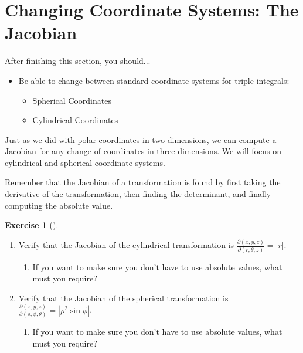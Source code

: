 \documentclass[10pt,]{book}
\theoremstyle{plain}
\theoremstyle{definition}
\theoremstyle{definition}
\theoremstyle{definition}
\theoremstyle{definition}
\newtheorem{exploration}[project]{Exercise}
\theoremstyle{definition}
\numberwithin{equation}{section}
\newcommand{\ds}{\displaystyle}
\begin{document}
\section[{Changing Coordinate Systems: The Jacobian}]{Changing Coordinate Systems: The Jacobian}\label{section-46}
After finishing this section, you should...%
\leavevmode%
\begin{itemize}[label=\textbullet]
\item{}Be able to change between standard coordinate systems for triple integrals:%
%
\begin{itemize}[label=$\circ$]
\item{}Spherical Coordinates%
\item{}Cylindrical Coordinates%
\end{itemize}
\end{itemize}
Just as we did with polar coordinates in two dimensions, we can compute a Jacobian for any change of coordinates in three dimensions. We will focus on cylindrical and spherical coordinate systems.%
\par
Remember that the Jacobian of a transformation is found by first taking the derivative of the transformation, then finding the determinant, and finally computing the absolute value.%
\begin{exploration}[]\label{exploration-302}
\leavevmode%
\begin{enumerate}[font=\bfseries,label=(\alph*),ref=\alph*]
\item\label{task-829} Verify that the Jacobian of the cylindrical transformation is \(\ds\frac{\partial(x,y,z)}{\partial(r,\theta,z)} = |r|\). \leavevmode%
\begin{itemize}[label=\textbullet]
\begin{enumerate}[font=\bfseries,label=(\alph*),ref=\alph*]
\item\label{task-830} If you want to make sure you don't have to use absolute values, what must you require?%
\end{enumerate}
\end{itemize}
%
\item\label{task-831} Verify that the Jacobian of the spherical transformation is \(\ds\frac{\partial(x,y,z)}{\partial(\rho,\phi,\theta)} = |\rho^2\sin\phi|\). \leavevmode%
\begin{itemize}[label=\textbullet]
\begin{enumerate}[font=\bfseries,label=(\alph*),ref=\alph*]
\item\label{task-832} If you want to make sure you don't have to use absolute values, what must you require?%
\end{enumerate}
\end{itemize}
%
\end{enumerate}
\end{exploration}
\end{document}
